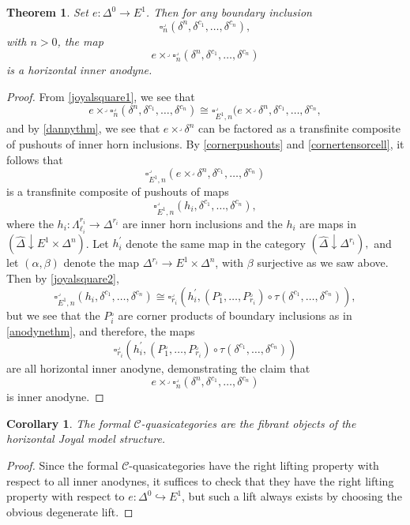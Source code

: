 \documentclass[leqno]{article}
\numberwithin{equation}{subsection}
\theoremstyle{plain}   %
\newtheorem{thm}[equation]{Theorem}
\newtheorem{cor}[equation]{Corollary}
\theoremstyle{remark}
\theoremstyle{plain}
\newcommand{\overcat}[2]{{\left(#1\downarrow #2\right)}}
\newcommand{\psh}[1]{\ensuremath{\widehat{#1}}}
\renewcommand{\C}{\ensuremath{\mathcal{C}}}
\begin{document}
\begin{thm}\label{joyalisothm}
	Set \(e:\Delta^0\to E^1\). Then for any boundary inclusion 
	\[\square_n^\lrcorner(\delta^n,\delta^{c_1},\dots,\delta^{c_n}),\]
	with \(n>0\), the map 
	\[e \times^\lrcorner \square_n^\lrcorner(\delta^n,\delta^{c_1},\dots,\delta^{c_n})\]
	is a horizontal inner anodyne.
\end{thm}
\begin{proof}
	From \ref{joyalsquare1}, we see that 
	\[e \times^\lrcorner \square^\lrcorner_n(\delta^n,\delta^{c_1},\dots,\delta^{c_n}) \cong \square^\lrcorner_{E^1,n}(e\times^\lrcorner \delta^n, \delta^{c_1},\dots,\delta^{c_n},\]
	and by \ref{dannythm}, we see that \(e\times^\lrcorner \delta^n\) can be factored as a transfinite composite of pushouts of inner horn inclusions.  By \ref{cornerpushouts} and \ref{cornertensorcell}, it follows that 
	\[\square^\lrcorner_{E^1,n}(e\times^\lrcorner \delta^n, \delta^{c_1},\dots,\delta^{c_n})\]
	is a transfinite composite of pushouts of maps
	\[\square^\lrcorner_{E^1,n}(h_i, \delta^{c_1},\dots,\delta^{c_n}),\]
	where the \(h_i:\Lambda^{r_i}_{\ell_i}\to \Delta^{r_i}\) are inner horn inclusions and the \(h_i\) are maps in \(\overcat{\psh{\Delta}}{E^1 \times \Delta^n}\).  Let \(h^\prime_i\) denote the same map in the category \(\overcat{\psh{\Delta}}{\Delta^{r_i}},\) and let \((\alpha,\beta)\) denote the map \(\Delta^{r_i} \to E^1 \times \Delta^n\), with \(\beta\) surjective as we saw above.  Then by \ref{joyalsquare2}, 
	\[\square_{E^1,n}^\lrcorner(h_i, \delta^{c_1},\dots,\delta^{c_n}) \cong \square^\lrcorner_{r_i}(h^\prime_i,(P_1^\lrcorner,\dots, P_{r_i}^\lrcorner) \circ \tau(\delta^{c_1},\dots,\delta^{c_n})),\]
	but we see that the \(P^\lrcorner_i\) are corner products of boundary inclusions as in \ref{anodynethm}, and therefore, the maps
	\[\square^\lrcorner_{r_i}(h^\prime_i,(P_1^\lrcorner,\dots, P_{r_i}^\lrcorner) \circ \tau(\delta^{c_1},\dots,\delta^{c_n}))\] 
	are all horizontal inner anodyne, demonstrating the claim that
	\[e \times^\lrcorner \square_n^\lrcorner(\delta^n,\delta^{c_1},\dots,\delta^{c_n})\]
	is inner anodyne.
\end{proof}
\begin{cor}
	The formal \(\C\)-quasicategories are the fibrant objects of the horizontal Joyal model structure.
\end{cor}
\begin{proof}
	Since the formal \(\C\)-quasicategories have the right lifting property with respect to all inner anodynes, it suffices to check that they have the right lifting property with respect to \(e:\Delta^0\hookrightarrow E^1\), but such a lift always exists by choosing the obvious degenerate lift.
\end{proof}
\end{document}

